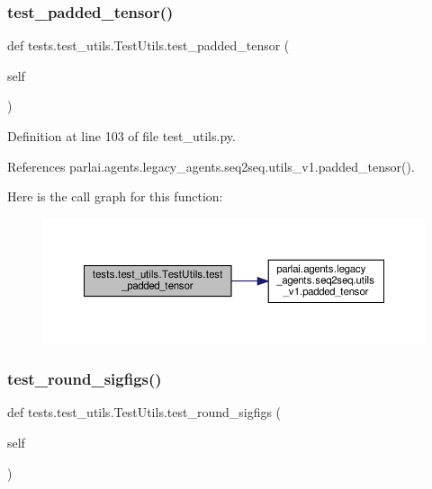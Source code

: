 \subsubsection{\texorpdfstring{test\+\_\+padded\+\_\+tensor()}{test\_padded\_tensor()}}
{\footnotesize\ttfamily def tests.\+test\+\_\+utils.\+Test\+Utils.\+test\+\_\+padded\+\_\+tensor (\begin{DoxyParamCaption}\item[{}]{self }\end{DoxyParamCaption})}



Definition at line 103 of file test\+\_\+utils.\+py.



References parlai.\+agents.\+legacy\+\_\+agents.\+seq2seq.\+utils\+\_\+v1.\+padded\+\_\+tensor().

Here is the call graph for this function\+:
\nopagebreak
\begin{figure}[H]
\begin{center}
\leavevmode
\includegraphics[width=350pt]{classtests_1_1test__utils_1_1TestUtils_a9d3d0280ce67a3e6b039b9184844dc45_cgraph}
\end{center}
\end{figure}
\mbox{\label{classtests_1_1test__utils_1_1TestUtils_aa020fc67900c834a020730f29cacc916}} 
\subsubsection{\texorpdfstring{test\+\_\+round\+\_\+sigfigs()}{test\_round\_sigfigs()}}
{\footnotesize\ttfamily def tests.\+test\+\_\+utils.\+Test\+Utils.\+test\+\_\+round\+\_\+sigfigs (\begin{DoxyParamCaption}\item[{}]{self }\end{DoxyParamCaption})}




